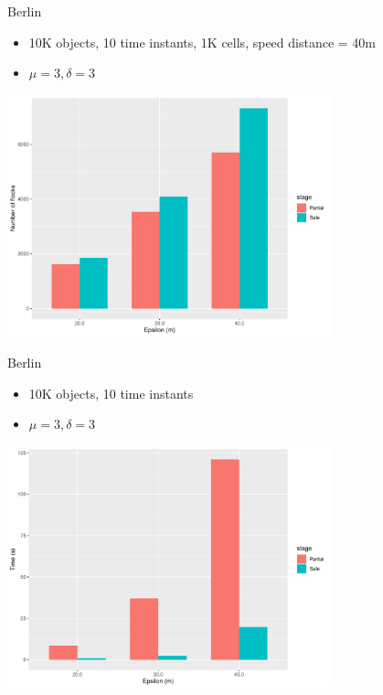 \documentclass{beamer}
\begin{document}
\begin{frame}{Berlin}
    \begin{itemize}
        \item 10K objects, 10 time instants, 1K cells, speed distance = 40m
        \item $\mu=3, \delta=3$
    \end{itemize}

    \centering
    \includegraphics[width=0.7\textwidth]{figures/pflock2_info}
\end{frame}
\begin{frame}{Berlin}
    \begin{itemize}
        \item 10K objects, 10 time instants
        \item $\mu=3, \delta=3$
    \end{itemize}

    \centering
    \includegraphics[width=0.7\textwidth]{figures/pflock2_time}
\end{frame}
\end{document}
